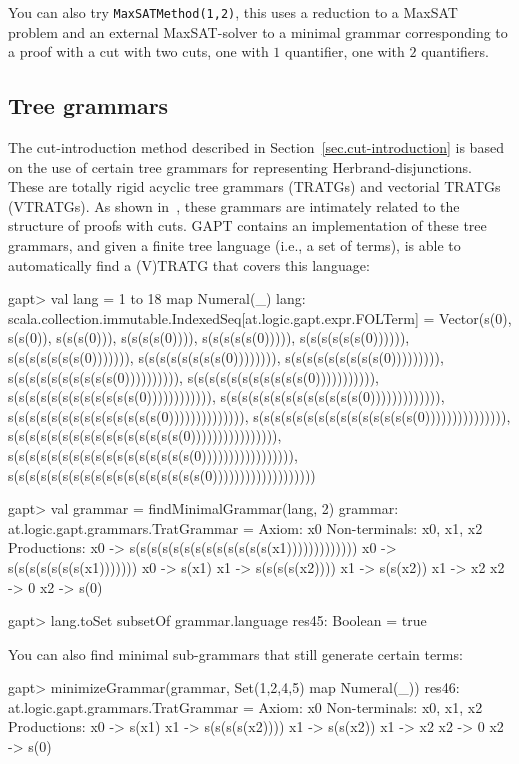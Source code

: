 \documentclass[a4paper,11pt]{article}
\begin{document}
You can also try \texttt{MaxSATMethod(1,2)}, this uses a reduction to a MaxSAT
problem and an external MaxSAT-solver to a
minimal grammar corresponding to a proof with a cut with two cuts, one with $1$
quantifier, one with $2$ quantifiers.

\subsection{Tree grammars}

The cut-introduction method described in Section~\ref{sec.cut-introduction} is
based on the use of certain tree grammars for representing Herbrand-disjunctions.
These are totally rigid acyclic tree grammars (TRATGs) and vectorial TRATGs (VTRATGs).
As shown in~\cite{Hetzl14Algorithmic}, these grammars are intimately related to
the structure of proofs with cuts.  GAPT contains an implementation of
these tree grammars, and given a finite tree language (i.e., a set of terms), is
able to automatically find a (V)TRATG that covers this language:

\begin{clilisting}
gapt> val lang = 1 to 18 map { Numeral(_) }
lang: scala.collection.immutable.IndexedSeq[at.logic.gapt.expr.FOLTerm] = Vector(s(0), s(s(0)), s(s(s(0))), s(s(s(s(0)))), s(s(s(s(s(0))))), s(s(s(s(s(s(0)))))), s(s(s(s(s(s(s(0))))))), s(s(s(s(s(s(s(s(0)))))))), s(s(s(s(s(s(s(s(s(0))))))))), s(s(s(s(s(s(s(s(s(s(0)))))))))), s(s(s(s(s(s(s(s(s(s(s(0))))))))))), s(s(s(s(s(s(s(s(s(s(s(s(0)))))))))))), s(s(s(s(s(s(s(s(s(s(s(s(s(0))))))))))))), s(s(s(s(s(s(s(s(s(s(s(s(s(s(0)))))))))))))), s(s(s(s(s(s(s(s(s(s(s(s(s(s(s(0))))))))))))))), s(s(s(s(s(s(s(s(s(s(s(s(s(s(s(s(0)))))))))))))))), s(s(s(s(s(s(s(s(s(s(s(s(s(s(s(s(s(0))))))))))))))))), s(s(s(s(s(s(s(s(s(s(s(s(s(s(s(s(s(s(0)))))))))))))))))))

gapt> val grammar = findMinimalGrammar(lang, 2)
grammar: at.logic.gapt.grammars.TratGrammar =
Axiom: x0
Non-terminals: x0, x1, x2
Productions:
  x0 -> s(s(s(s(s(s(s(s(s(s(s(s(s(x1)))))))))))))
  x0 -> s(s(s(s(s(s(s(x1)))))))
  x0 -> s(x1)
  x1 -> s(s(s(s(x2))))
  x1 -> s(s(x2))
  x1 -> x2
  x2 -> 0
  x2 -> s(0)

gapt> lang.toSet subsetOf grammar.language
res45: Boolean = true

\end{clilisting}

You can also find minimal sub-grammars that still generate certain terms:
\begin{clilisting}
gapt> minimizeGrammar(grammar, Set(1,2,4,5) map {Numeral(_)})
res46: at.logic.gapt.grammars.TratGrammar =
Axiom: x0
Non-terminals: x0, x1, x2
Productions:
  x0 -> s(x1)
  x1 -> s(s(s(s(x2))))
  x1 -> s(s(x2))
  x1 -> x2
  x2 -> 0
  x2 -> s(0)

\end{clilisting}
\end{document}

